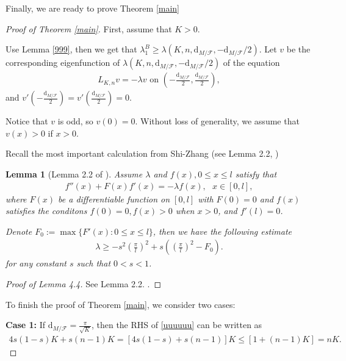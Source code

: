 \documentclass[11pt]{amsart}
\newtheorem{lemma}[theorem]{Lemma}
\def\d{\mathrm{d}}
\begin{document}
Finally, we are ready to prove Theorem \ref{main}
\begin{proof}[Proof of Theorem \ref{main}]
First, assume that $K>0$.

    Use Lemma \ref{999}, then we get that $\lambda_1^B\geq \lambda(K,n,\d_{M/\mathcal{F}},-\d_{M/\mathcal{F}}/2)$. Let $v$ be the corresponding eigenfunction of $\lambda(K,n,\d_{M/\mathcal{F}},-\d_{M/\mathcal{F}}/2)$ of the equation
    \begin{align*}
        L_{K,n}v=-\lambda v\text{ on }\left(-\frac{\d_{M/\mathcal{F}}}{2},\frac{\d_{M/\mathcal{F}}}{2}\right),
    \end{align*}and $v'\left(-\frac{\d_{M/\mathcal{F}}}{2}\right)=v'\left(\frac{\d_{M/\mathcal{F}}}{2}\right)=0$.

    Notice that $v$ is odd, so $v(0)=0$. Without loss of generality, we assume that $v(x)> 0$ if $x>0$.

    Recall the most important calculation from Shi-Zhang (see Lemma 2.2, \cite{shizhang})
    \begin{lemma}[Lemma 2.2 of \cite{shizhang}]\label{abcde}
        Assume $\lambda$ and $f(x),0\leq x\leq l$ satisfy that
        \begin{align*}
            f''(x)+F(x)f'(x)=-\lambda f(x),\text{ }x\in [0,l],
        \end{align*}where $F(x)$ be a differentiable function on $[0,l]$ with $F(0)=0$ and $f(x)$ satisfies the conditons $f(0)=0, f(x)>0$ when $x>0$, and $f'(l)=0$.

        Denote $F_0:=\max \{F'(x):0\leq x\leq l\}$, then we have the following estimate
        \begin{align}\label{zzz}
            \lambda\geq-s^2\left(\frac{\pi}{l}\right)^2+s\left(\left(\frac{\pi}{l}\right)^2-F_0\right).
        \end{align}for any constant $s$ such that $0<s<1$.
    \end{lemma}
    \begin{proof}[Proof of Lemma 4.4] See Lemma 2.2. \cite{shizhang}.
        
    \end{proof}
To finish the proof of Theorem \ref{main}, we consider two cases:
 
 
 \textbf{Case 1:} If $\d_{M/\mathcal{F}}=\frac{\pi}{\sqrt{K}}$, then the RHS of \ref{uuuuuu} can be written as
\begin{align*}
    4s(1-s)K+s(n-1)K=[4s(1-s)+s(n-1)]K\leq [1+(n-1)K]=nK.
\end{align*}


\end{proof}
\end{document}
